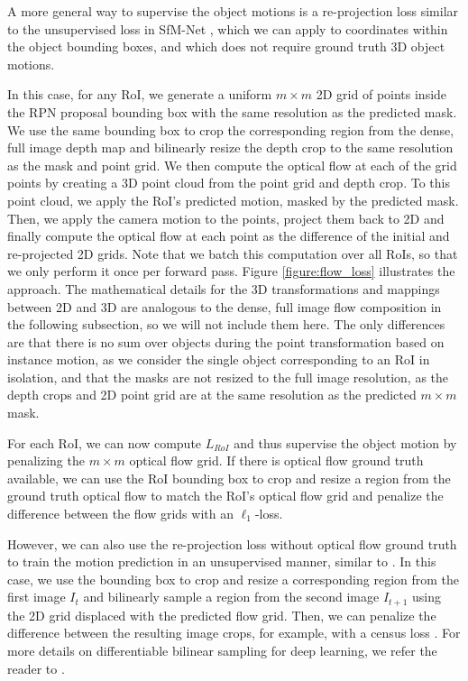A more general way to supervise the object motions is a re-projection
loss similar to the unsupervised loss in SfM-Net \cite{SfmNet},
which we can apply to coordinates within the object bounding boxes,
and which does not require ground truth 3D object motions.

In this case, for any RoI,
we generate a uniform $m \times m$ 2D grid of points inside the RPN proposal bounding box
with the same resolution as the predicted mask.
We use the same bounding box
to crop the corresponding region from the dense, full image depth map
and bilinearly resize the depth crop to the same resolution as the mask and point
grid.
We then compute the optical flow at each of the grid points by creating
a 3D point cloud from the point grid and depth crop. To this point cloud, we
apply the RoI's predicted motion, masked by the predicted mask.
Then, we apply the camera motion to the points, project them back to 2D
and finally compute the optical flow at each point as the difference of the initial and re-projected 2D grids.
Note that we batch this computation over all RoIs, so that we only perform
it once per forward pass. Figure \ref{figure:flow_loss} illustrates the approach.
The mathematical details for the 3D transformations and mappings between 2D and 3D are analogous to the
dense, full image flow composition in the following subsection, so we will not
include them here. The only differences are that there is no sum over objects during
the point transformation based on instance motion, as we consider the single object
corresponding to an RoI in isolation, and that the masks are not resized to the
full image resolution, as
the depth crops and 2D point grid are at the same resolution as the predicted
$m \times m$ mask.

For each RoI, we can now compute $L_{RoI}$ and thus supervise the object motion
by penalizing the $m \times m$ optical flow grid.
If there is optical flow ground truth available, we can use the RoI bounding box to
crop and resize a region from the ground truth optical flow to match the RoI's
optical flow grid and penalize the difference between the flow grids with an $\ell_1$-loss.

However, we can also use the re-projection loss without optical flow ground truth
to train the motion prediction in an unsupervised manner, similar to \cite{SfmNet}.
In this case, we use the bounding box to crop and resize a corresponding region
from the first image $I_t$ and bilinearly sample a region from the second image $I_{t+1}$
using the 2D grid displaced with the predicted flow grid. Then, we can penalize the difference
between the resulting image crops, for example, with a census loss \cite{CensusTerm,UnFlow}.
For more details on differentiable bilinear sampling for deep learning, we refer the reader to
\cite{STN}.

